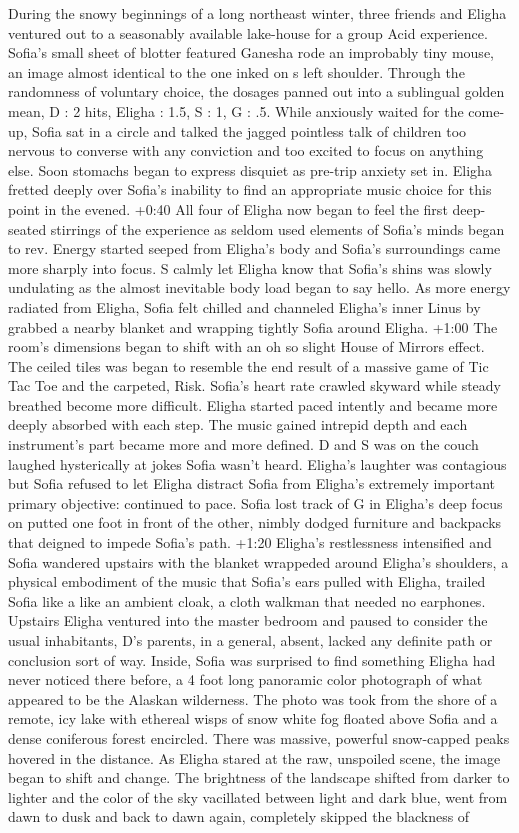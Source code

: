 \documentclass[12pt]{book}
\begin{document}
During the snowy beginnings of a long northeast winter, three friends and Eligha ventured out to a seasonably available lake-house for a group Acid experience. Sofia's small sheet of blotter featured Ganesha rode an improbably tiny mouse, an image almost identical to the one inked on s left shoulder. Through the randomness of voluntary choice, the dosages panned out into a sublingual golden mean, D : 2 hits, Eligha : 1.5, S : 1, G : .5. While anxiously waited for the come-up, Sofia sat in a circle and talked the jagged pointless talk of children too nervous to converse with any conviction and too excited to focus on anything else. Soon stomachs began to express disquiet as pre-trip anxiety set in. Eligha fretted deeply over Sofia's inability to find an appropriate music choice for this point in the evened. +0:40 All four of Eligha now began to feel the first deep-seated stirrings of the experience as seldom used elements of Sofia's minds began to rev. Energy started seeped from Eligha's body and Sofia's surroundings came more sharply into focus. S calmly let Eligha know that Sofia's shins was slowly undulating as the almost inevitable body load began to say hello. As more energy radiated from Eligha, Sofia felt chilled and channeled Eligha's inner Linus by grabbed a nearby blanket and wrapping tightly Sofia around Eligha. +1:00 The room's dimensions began to shift with an oh so slight House of Mirrors effect. The ceiled tiles was began to resemble the end result of a massive game of Tic Tac Toe and the carpeted, Risk. Sofia's heart rate crawled skyward while steady breathed become more difficult. Eligha started paced intently and became more deeply absorbed with each step. The music gained intrepid depth and each instrument's part became more and more defined. D and S was on the couch laughed hysterically at jokes Sofia wasn't heard. Eligha's laughter was contagious but Sofia refused to let Eligha distract Sofia from Eligha's extremely important primary objective: continued to pace. Sofia lost track of G in Eligha's deep focus on putted one foot in front of the other, nimbly dodged furniture and backpacks that deigned to impede Sofia's path. +1:20 Eligha's restlessness intensified and Sofia wandered upstairs with the blanket wrappeded around Eligha's shoulders, a physical embodiment of the music that Sofia's ears pulled with Eligha, trailed Sofia like a like an ambient cloak, a cloth walkman that needed no earphones. Upstairs Eligha ventured into the master bedroom and paused to consider the usual inhabitants, D's parents, in a general, absent, lacked any definite path or conclusion sort of way. Inside, Sofia was surprised to find something Eligha had never noticed there before, a 4 foot long panoramic color photograph of what appeared to be the Alaskan wilderness. The photo was took from the shore of a remote, icy lake with ethereal wisps of snow white fog floated above Sofia and a dense coniferous forest encircled. There was massive, powerful snow-capped peaks hovered in the distance. As Eligha stared at the raw, unspoiled scene, the image began to shift and change. The brightness of the landscape shifted from darker to lighter and the color of the sky vacillated between light and dark blue, went from dawn to dusk and back to dawn again, completely skipped the blackness of 
\end{document}

